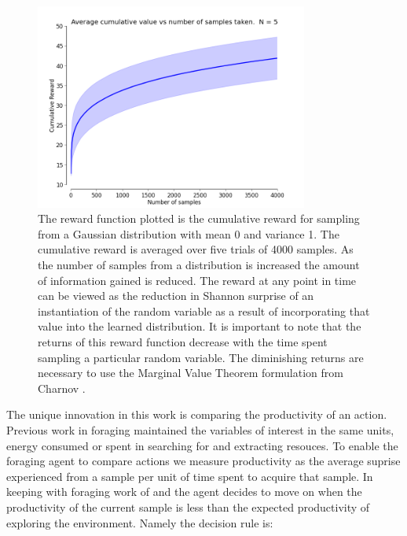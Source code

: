 
\begin{figure}[htpd!]
	\centering
	\includegraphics[width=0.8\textwidth]{images/cumulative-reward.png}
	\caption{The reward function plotted is the cumulative reward for sampling from a Gaussian distribution with mean 0 and variance 1.  The cumulative reward is averaged over five trials of 4000 samples.  As the number of samples from a distribution is increased the amount of information gained is reduced.  The reward at any point in time can be viewed as the reduction in Shannon surprise of an instantiation of the random variable as a result of incorporating that value into the learned distribution.  It is important to note that the returns of this reward function decrease with the time spent sampling a particular random variable.  The diminishing returns are necessary to use the Marginal Value Theorem formulation from Charnov \cite{charnov1973optimal}.}
	\label{fig:reward}
\end{figure}

The unique innovation in this work is comparing the productivity of an action.  Previous work in foraging maintained the variables of interest in the same units, energy consumed or spent in searching for and extracting resouces.  To enable the foraging agent to compare actions we measure productivity as the average suprise experienced from a sample per unit of time spent to acquire that sample.  In keeping with foraging work of \cite{charnov1973optimal} and \cite{pirolli1999information} the agent decides to move on when the productivity of the current sample is less than the expected productivity of exploring the environment.  Namely the decision rule is:

